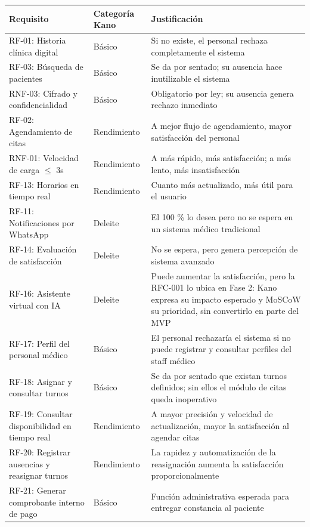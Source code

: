 \documentclass[11pt,a4paper]{article}
\begin{document}
	\begin{longtable}{p{} p{} p{}}
		
		\toprule
		\textbf{Requisito} &
		\textbf{Categoría Kano} &
		\textbf{Justificación} \\
		\midrule
		\endhead
		
		\bottomrule
		\endlastfoot
		RF-01: Historia clínica digital & Básico & Si no existe, el personal rechaza completamente el sistema \\
		RF-03: Búsqueda de pacientes & Básico & Se da por sentado; su ausencia hace inutilizable el sistema \\
		RNF-03: Cifrado y confidencialidad & Básico & Obligatorio por ley; su ausencia genera rechazo inmediato \\
		RF-02: Agendamiento de citas & Rendimiento & A mejor flujo de agendamiento, mayor satisfacción del personal \\
		RNF-01: Velocidad de carga \(\leq\) 3s & Rendimiento & A más rápido, más satisfacción; a más lento, más insatisfacción \\
		RF-13: Horarios en tiempo real & Rendimiento & Cuanto más actualizado, más útil para el usuario \\
		RF-11: Notificaciones por WhatsApp & Deleite & El 100 \% lo desea pero no se espera en un sistema médico tradicional \\
		RF-14: Evaluación de satisfacción & Deleite & No se espera, pero genera percepción de sistema avanzado \\
		RF-16: Asistente virtual con IA & Deleite & Puede aumentar la satisfacción, pero la RFC-001 lo ubica en Fase 2: Kano expresa su impacto esperado y MoSCoW su prioridad, sin convertirlo en parte del MVP \\
		RF-17: Perfil del personal médico & Básico & El personal rechazaría el sistema si no puede registrar y consultar perfiles del staff médico \\
		RF-18: Asignar y consultar turnos & Básico & Se da por sentado que existan turnos definidos; sin ellos el módulo de citas queda inoperativo \\
		RF-19: Consultar disponibilidad en tiempo real & Rendimiento & A mayor precisión y velocidad de actualización, mayor la satisfacción al agendar citas \\
		RF-20: Registrar ausencias y reasignar turnos & Rendimiento & La rapidez y automatización de la reasignación aumenta la satisfacción proporcionalmente \\
		RF-21: Generar comprobante interno de pago & Básico & Función administrativa esperada para entregar constancia al paciente \\

\end{longtable}
\end{document}
